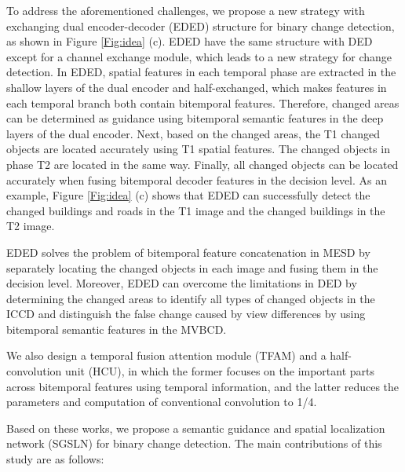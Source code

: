 \documentclass[journal]{IEEEtran}
\begin{document}
To address the aforementioned challenges, we propose a new strategy with exchanging dual encoder-decoder (EDED) structure for binary change detection, as shown in Figure \ref{Fig:idea} (c). 
EDED have the same structure with DED except for a channel exchange module, which leads to a new strategy for change detection. In EDED, spatial features in each temporal phase are extracted in the shallow layers of the dual encoder and half-exchanged, which makes features in each temporal branch both contain bitemporal features. Therefore, changed areas can be determined as guidance using bitemporal semantic features in the deep layers of the dual encoder. Next, based on the changed areas, the T1 changed objects are located accurately using T1 spatial features. The changed objects in phase T2 are located in the same way. Finally, all changed objects can be located accurately when fusing bitemporal decoder features in the decision level. As an example, Figure \ref{Fig:idea} (c) shows that EDED can successfully detect the changed buildings and roads in the T1 image and the changed buildings in the T2 image.

EDED solves the problem of bitemporal feature concatenation in MESD by separately locating the changed objects in each image and fusing them in the decision level. Moreover, EDED can overcome the limitations in DED by determining the changed areas to identify all types of changed objects in the ICCD and distinguish the false change caused by view differences by using bitemporal semantic features in the MVBCD.

We also design a temporal fusion attention module (TFAM) and a half-convolution unit (HCU), in which the former focuses on the important parts across bitemporal features using temporal information, and the latter reduces the parameters and computation of conventional convolution to 1/4.

Based on these works, we propose a semantic guidance and spatial localization network (SGSLN) for binary change detection. The main contributions of this study are as follows: 
\end{document}
